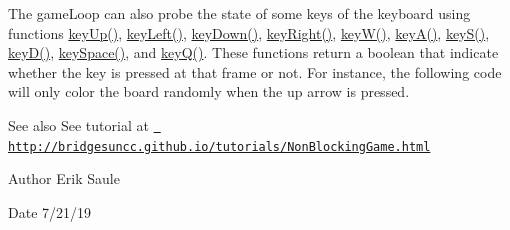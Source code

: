 The game\+Loop can also probe the state of some keys of the keyboard using functions \mbox{\hyperlink{classbridges_1_1games_1_1_non_blocking_game_a524c340fabec1b7a69aa742e1347b7b4}{key\+Up()}}, \mbox{\hyperlink{classbridges_1_1games_1_1_non_blocking_game_ac8b9a6d6d4074105af6d28995091bd2b}{key\+Left()}}, \mbox{\hyperlink{classbridges_1_1games_1_1_non_blocking_game_ac59c5ac18a456cc1d69ec8d42a311840}{key\+Down()}}, \mbox{\hyperlink{classbridges_1_1games_1_1_non_blocking_game_a5a3db63942e995409daaf6b89f88b203}{key\+Right()}}, \mbox{\hyperlink{classbridges_1_1games_1_1_non_blocking_game_a45db18869044968a233a6f217650e34d}{key\+W()}}, \mbox{\hyperlink{classbridges_1_1games_1_1_non_blocking_game_a4328a21ca65c26e11161dfe362770917}{key\+A()}}, \mbox{\hyperlink{classbridges_1_1games_1_1_non_blocking_game_a4beb82246ef1eaf8c13aa406632ab936}{key\+S()}}, \mbox{\hyperlink{classbridges_1_1games_1_1_non_blocking_game_a830a2e8127b042f8915deb61f0038f2a}{key\+D()}}, \mbox{\hyperlink{classbridges_1_1games_1_1_non_blocking_game_a4ff32a8ba8aeb3f438751729f7380d16}{key\+Space()}}, and \mbox{\hyperlink{classbridges_1_1games_1_1_non_blocking_game_a4075b3185f2fe0d20c9ed9957c448aee}{key\+Q()}}. These functions return a boolean that indicate whether the key is pressed at that frame or not. For instance, the following code will only color the board randomly when the up arrow is pressed.


\begin{DoxyCode}{0}
\DoxyCodeLine{\}}
\end{DoxyCode}


\begin{DoxySeeAlso}{See also}
See tutorial at \href{http://bridgesuncc.github.io/tutorials/NonBlockingGame.html}{\texttt{ http\+://bridgesuncc.\+github.\+io/tutorials/\+Non\+Blocking\+Game.\+html}}
\end{DoxySeeAlso}
\begin{DoxyAuthor}{Author}
Erik Saule 
\end{DoxyAuthor}
\begin{DoxyDate}{Date}
7/21/19 
\end{DoxyDate}
